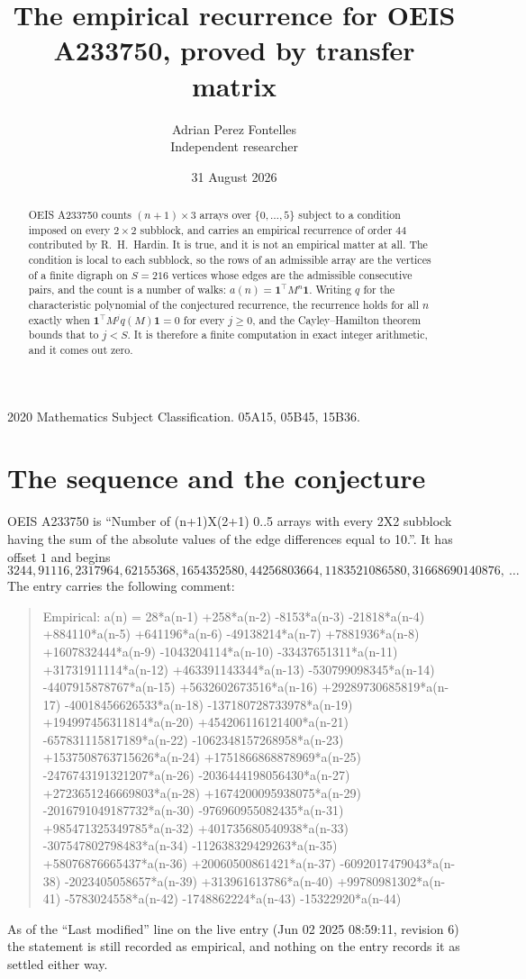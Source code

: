 \documentclass[11pt,a4paper]{article}
\title{The empirical recurrence for OEIS A233750, proved by transfer matrix}
\author{Adrian Perez Fontelles\\ \small Independent researcher}
\date{31 August 2026}
\theoremstyle{plain}
\theoremstyle{definition}
\begin{document}
\maketitle

\begin{abstract}
OEIS A233750 counts $(n+1)\times3$ arrays over $\{0,\dots,5\}$ subject to a condition imposed on
every $2\times2$ subblock, and carries an empirical recurrence of order $44$ contributed
by R.~H.~Hardin. It is true, and it is not an empirical matter at all. The condition is local
to each subblock, so the rows of an admissible array are the vertices of a finite digraph
on $S=216$ vertices whose edges are the admissible consecutive pairs, and the count is a
number of walks: $a(n)=\mathbf{1}^{\!\top}M^{n}\mathbf{1}$. Writing $q$
for the characteristic polynomial of the conjectured recurrence, the recurrence holds for all
$n$ exactly when $\mathbf{1}^{\!\top}M^{j}q(M)\mathbf{1}=0$ for every $j\ge0$, and the
Cayley--Hamilton theorem bounds that to $j<S$. It is therefore a finite computation in exact
integer arithmetic, and it comes out zero.
\end{abstract}

\noindent\small 2020 Mathematics Subject Classification. 05A15, 05B45, 15B36.\normalsize

\section{The sequence and the conjecture}

OEIS A233750 is ``Number of (n+1)X(2+1) 0..5 arrays with every 2X2 subblock having the sum of the absolute values of the edge differences equal to 10.''. It has offset $1$ and begins
\[
3244, 91116, 2317964, 62155368, 1654352580, 44256803664, 1183521086580, 31668690140876,\ \dots
\]
The entry carries the following comment:
\begin{quote}\small
Empirical: a(n) = 28*a(n-1) +258*a(n-2) -8153*a(n-3) -21818*a(n-4) +884110*a(n-5) +641196*a(n-6) -49138214*a(n-7) +7881936*a(n-8) +1607832444*a(n-9) -1043204114*a(n-10) -33437651311*a(n-11) +31731911114*a(n-12) +463391143344*a(n-13) -530799098345*a(n-14) -4407915878767*a(n-15) +5632602673516*a(n-16) +29289730685819*a(n-17) -40018456626533*a(n-18) -137180728733978*a(n-19) +194997456311814*a(n-20) +454206116121400*a(n-21) -657831115817189*a(n-22) -1062348157268958*a(n-23) +1537508763715626*a(n-24) +1751866868878969*a(n-25) -2476743191321207*a(n-26) -2036444198056430*a(n-27) +2723651246669803*a(n-28) +1674200095938075*a(n-29) -2016791049187732*a(n-30) -976960955082435*a(n-31) +985471325349785*a(n-32) +401735680540938*a(n-33) -307547802798483*a(n-34) -112638329429263*a(n-35) +58076876665437*a(n-36) +20060500861421*a(n-37) -6092017479043*a(n-38) -2023405058657*a(n-39) +313961613786*a(n-40) +99780981302*a(n-41) -5783024558*a(n-42) -1748862224*a(n-43) -15322920*a(n-44)
\end{quote}
As of the ``Last modified'' line on the live entry (Jun 02 2025 08:59:11, revision 6) the statement is
still recorded as empirical, and nothing on the entry records it as settled either way.
\end{document}
